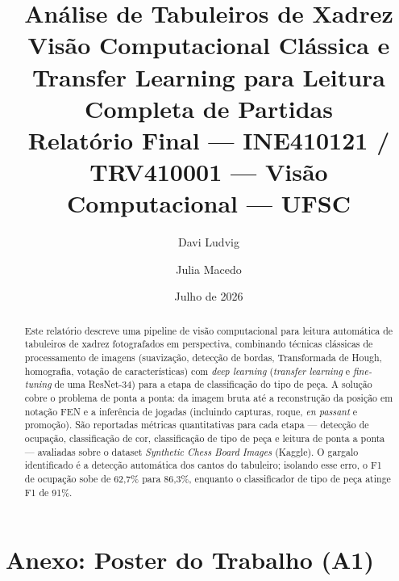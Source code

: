 \documentclass[11pt,a4paper]{article}
\title{
  \Large Análise de Tabuleiros de Xadrez\\
  \large Visão Computacional Clássica e Transfer Learning para Leitura Completa de Partidas\\[0.5em]
  \normalsize Relatório Final --- INE410121 / TRV410001 --- Visão Computacional --- UFSC
}
\author{Davi Ludvig \and Julia Macedo}
\date{Julho de 2026}
\begin{document}
\maketitle

\begin{abstract}
\noindent
Este relatório descreve uma pipeline de visão computacional para leitura automática de
tabuleiros de xadrez fotografados em perspectiva, combinando técnicas clássicas de
processamento de imagens (suavização, detecção de bordas, Transformada de Hough,
homografia, votação de características) com \textit{deep learning} (\textit{transfer
learning} e \textit{fine-tuning} de uma ResNet-34) para a etapa de classificação do tipo
de peça. A solução cobre o problema de ponta a ponta: da imagem bruta até a
reconstrução da posição em notação FEN e a inferência de jogadas (incluindo capturas,
roque, \textit{en passant} e promoção). São reportadas métricas quantitativas para cada
etapa --- detecção de ocupação, classificação de cor, classificação de tipo de peça e
leitura de ponta a ponta --- avaliadas sobre o dataset \textit{Synthetic Chess Board
Images} (Kaggle). O gargalo identificado é a detecção automática dos cantos do
tabuleiro; isolando esse erro, o F1 de ocupação sobe de 62,7\% para 86,3\%, enquanto o
classificador de tipo de peça atinge F1 de 91\%.
\end{abstract}

\tableofcontents
\newpage












\printbibliography

\clearpage
\section*{Anexo: Poster do Trabalho (A1)}
\label{sec:poster}

\end{document}
